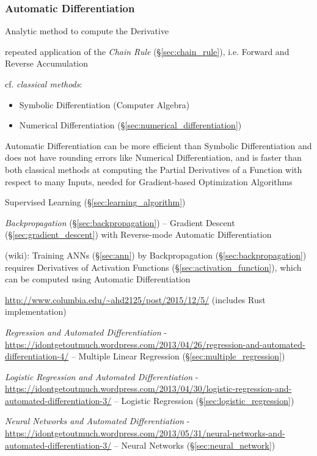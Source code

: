 \subsubsection{Automatic Differentiation}\label{sec:automatic_differentiation}

Analytic method to compute the Derivative

repeated application of the \emph{Chain Rule} (\S\ref{sec:chain_rule}), i.e.
Forward and Reverse Accumulation

cf. \emph{classical methods}:

\begin{itemize}
  \item Symbolic Differentiation (Computer Algebra)
  \item Numerical Differentiation (\S\ref{sec:numerical_differentiation})
\end{itemize}

Automatic Differentiation can be more efficient than Symbolic Differentiation
and does not have rounding errors like Numerical Differentiation, and is faster
than both classical methods at computing the Partial Derivatives of a Function
with respect to many Inputs, needed for Gradient-based Optimization Algorithms

Supervised Learning (\S\ref{sec:learning_algorithm})

\emph{Backpropagation} (\S\ref{sec:backpropagation}) -- Gradient Descent
(\S\ref{sec:gradient_descent}) with Reverse-mode Automatic Differentiation

(wiki): Training ANNs (\S\ref{sec:ann}) by Backpropagation
(\S\ref{sec:backpropagation}) requires Derivatives of Activation Functions
(\S\ref{sec:activation_function}), which can be computed using Automatic
Differentiation

\asterism

\url{http://www.columbia.edu/~ahd2125/post/2015/12/5/} (includes Rust
implementation)

\asterism

\emph{Regression and Automated Differentiation} -
\url{https://idontgetoutmuch.wordpress.com/2013/04/26/regression-and-automated-differentiation-4/}
-- Multiple Linear Regression (\S\ref{sec:multiple_regression})

\emph{Logistic Regression and Automated Differentiation} -
\url{https://idontgetoutmuch.wordpress.com/2013/04/30/logistic-regression-and-automated-differentiation-3/}
-- Logistic Regression (\S\ref{sec:logistic_regression})

\emph{Neural Networks and Automated Differentiation} -
\url{https://idontgetoutmuch.wordpress.com/2013/05/31/neural-networks-and-automated-differentiation-3/}
-- Neural Networks (\S\ref{sec:neural_network})

